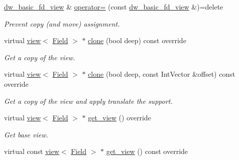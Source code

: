 \begin{DoxyCompactItemize}
\hyperlink{classUintah_1_1PhaseField_1_1detail_1_1dw__basic__fd__view}{dw\+\_\+basic\+\_\+fd\+\_\+view} \& \hyperlink{classUintah_1_1PhaseField_1_1detail_1_1dw__basic__fd__view_3_01ScalarField_3_01T_01_4_00_01STN_00_01VAR_01_4_ae2fa9eab3d9f771513f111e8ba0fe27c}{operator=} (const \hyperlink{classUintah_1_1PhaseField_1_1detail_1_1dw__basic__fd__view}{dw\+\_\+basic\+\_\+fd\+\_\+view} \&)=delete
\begin{DoxyCompactList}\small\item\em Prevent copy (and move) assignment. \end{DoxyCompactList}\item 
virtual \hyperlink{classUintah_1_1PhaseField_1_1detail_1_1view}{view}$<$ \hyperlink{structUintah_1_1PhaseField_1_1ScalarField}{Field} $>$ $\ast$ \hyperlink{classUintah_1_1PhaseField_1_1detail_1_1dw__basic__fd__view_3_01ScalarField_3_01T_01_4_00_01STN_00_01VAR_01_4_a4eb9e3d89bde232c59088512c30b2ce7}{clone} (bool deep) const override
\begin{DoxyCompactList}\small\item\em Get a copy of the view. \end{DoxyCompactList}\item 
virtual \hyperlink{classUintah_1_1PhaseField_1_1detail_1_1view}{view}$<$ \hyperlink{structUintah_1_1PhaseField_1_1ScalarField}{Field} $>$ $\ast$ \hyperlink{classUintah_1_1PhaseField_1_1detail_1_1dw__basic__fd__view_3_01ScalarField_3_01T_01_4_00_01STN_00_01VAR_01_4_aea06a1fde74c23fae95356021548da34}{clone} (bool deep, const Int\+Vector \&offset) const override
\begin{DoxyCompactList}\small\item\em Get a copy of the view and apply translate the support. \end{DoxyCompactList}\item 
virtual \hyperlink{classUintah_1_1PhaseField_1_1detail_1_1view}{view}$<$ \hyperlink{structUintah_1_1PhaseField_1_1ScalarField}{Field} $>$ $\ast$ \hyperlink{classUintah_1_1PhaseField_1_1detail_1_1dw__basic__fd__view_3_01ScalarField_3_01T_01_4_00_01STN_00_01VAR_01_4_ada3c79dde199711c630431fad25fbc2e}{get\+\_\+view} () override
\begin{DoxyCompactList}\small\item\em Get base view. \end{DoxyCompactList}\item 
virtual const \hyperlink{classUintah_1_1PhaseField_1_1detail_1_1view}{view}$<$ \hyperlink{structUintah_1_1PhaseField_1_1ScalarField}{Field} $>$ $\ast$ \hyperlink{classUintah_1_1PhaseField_1_1detail_1_1dw__basic__fd__view_3_01ScalarField_3_01T_01_4_00_01STN_00_01VAR_01_4_af125295808e73f3d236f85f45d054b23}{get\+\_\+view} () const override

\end{DoxyCompactItemize}
